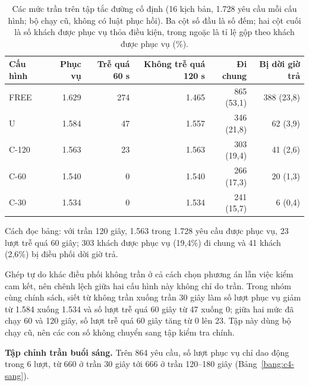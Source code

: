 \begin{table}[htbp]
\centering
\caption{Các mức trần trên tập tắc đường cố định (16 kịch bản, 1.728 yêu cầu mỗi cấu hình; bộ chạy cũ,
không có luật phục hồi). Ba cột số đầu là số đếm; hai cột cuối là số khách được phục vụ thỏa điều kiện, trong ngoặc
là tỉ lệ gộp theo khách được phục vụ (\%).}
\label{bang:c4-codinh}
\small
\begin{tabular}{@{}lrrrrr@{}}
\toprule
\textbf{Cấu hình} & \textbf{Phục vụ} & \textbf{Trễ quá 60 s} & \textbf{Không trễ quá 120 s} &
\textbf{Đi chung} & \textbf{Bị dời giờ trả}\\
\midrule
FREE & 1.629 & 274 & 1.465 & 865 (53,1) & 388 (23,8)\\
U & 1.584 & 47 & 1.557 & 346 (21,8) & 62 (3,9)\\
C-120 & 1.563 & 23 & 1.563 & 303 (19,4) & 41 (2,6)\\
C-60 & 1.540 & 0 & 1.540 & 266 (17,3) & 20 (1,3)\\
C-30 & 1.534 & 0 & 1.534 & 241 (15,7) & 6 (0,4)\\
\bottomrule
\end{tabular}
\end{table}

Cách đọc bảng: với trần 120 giây, 1.563 trong 1.728 yêu cầu được phục vụ, 23 lượt trễ quá 60 giây; 303 khách được
phục vụ (19,4\%) đi chung và 41 khách (2,6\%) bị điều phối dời giờ trả.

Ghép tự do khác điều phối không trần ở cả cách chọn phương án lẫn việc kiểm cam kết, nên chênh lệch giữa hai cấu hình
này không chỉ do trần. Trong nhóm cùng chính sách, siết từ không trần xuống trần 30 giây làm số lượt phục vụ giảm từ
1.584 xuống 1.534 và số lượt trễ quá 60 giây từ 47 xuống 0; giữa hai mức đã chạy 60 và 120 giây, số lượt trễ quá 60
giây tăng từ 0 lên 23. Tập này dùng bộ chạy cũ, nên các con số không chuyển sang tập kiểm tra chính.

\textbf{Tập chỉnh trần buổi sáng.} Trên 864 yêu cầu, số lượt phục vụ chỉ dao động trong 6 lượt, từ 660 ở trần 30
giây tới 666 ở trần 120--180 giây (Bảng~\ref{bang:c4-sang}).

